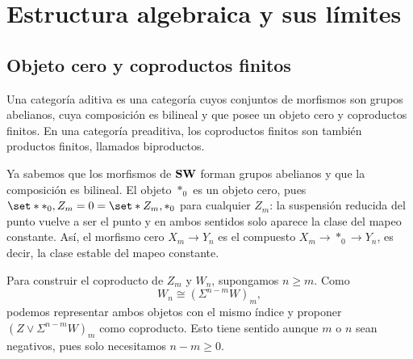 \section{Estructura algebraica y sus límites}

\subsection{Objeto cero y coproductos finitos}
\begin{defi}
Una categoría aditiva es una categoría cuyos conjuntos de morfismos son grupos abelianos, cuya composición es bilineal y que posee un objeto cero y coproductos finitos. En una categoría preaditiva, los coproductos finitos son también productos finitos, llamados biproductos.
\end{defi}

Ya sabemos que los morfismos de $\mathbf{SW}$ forman grupos abelianos y que la composición es bilineal. El objeto $*_0$ es un objeto cero, pues $\set*{*_0,Z_m}=0=\set*{Z_m,*_0}$ para cualquier $Z_m$: la suspensión reducida del punto vuelve a ser el punto y en ambos sentidos solo aparece la clase del mapeo constante. Así, el morfismo cero $X_m\to Y_n$ es el compuesto $X_m\to *_0\to Y_n$, es decir, la clase estable del mapeo constante.

Para construir el coproducto de $Z_m$ y $W_n$, supongamos $n\geq m$. Como
\[
W_n\cong(\Sigma^{n-m}W)_m,
\]
 podemos representar ambos objetos con el mismo índice y proponer $(Z\vee\Sigma^{n-m}W)_m$ como coproducto. Esto tiene sentido aunque $m$ o $n$ sean negativos, pues solo necesitamos $n-m\geq0$.

